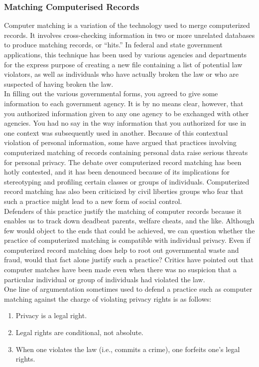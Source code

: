 \documentclass[12pt]{article}
\theoremstyle{definition}
\begin{document}
\subsubsection{Matching Computerised Records}
Computer matching is a variation of the technology used to merge computerized records.
It involves cross-checking information in two or more unrelated databases to produce
matching records, or “hits.” In federal and state government applications, this technique
has been used by various agencies and departments for the express purpose of creating a
new file containing a list of potential law violators, as well as individuals who have
actually broken the law or who are suspected of having broken the law.\\
In filling out the various governmental forms, you agreed to give some information to
each government agency. It is by no means clear, however, that you authorized
information given to any one agency to be exchanged with other agencies. You had
no say in the way information that you authorized for use in one context was subsequently
used in another. Because of this contextual violation of personal information, some have
argued that practices involving computerized matching of records containing personal
data raise serious threats for personal privacy. The debate over computerized record
matching has been hotly contested, and it has been denounced because of its implications
for stereotyping and profiling certain classes or groups of individuals. Computerized
record matching has also been criticized by civil liberties groups who fear that such a
practice might lead to a new form of social control.\\
Defenders of this practice justify the matching of computer records because it enables
us to track down deadbeat parents, welfare cheats, and the like. Although few would object
to the ends that could be achieved, we can question whether the practice of computerized
matching is compatible with individual privacy. Even if computerized record matching does help to root out governmental waste and fraud, would that fact alone justify such
a practice? Critics have pointed out that
computer matches have been made even when there was no suspicion that a particular
individual or group of individuals had violated the law.\\
One line of argumentation sometimes used to defend
a practice such as computer matching against the charge of violating privacy rights is
as follows:
\begin{enumerate}[label=PREMISE \arabic*]
\item Privacy is a legal right.
\item Legal rights are conditional, not absolute.
\item When one violates the law (i.e., commits a crime), one forfeits one’s
legal rights.
\end{enumerate}
\end{document}
